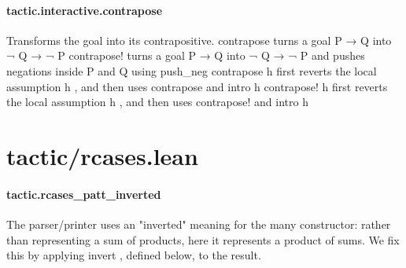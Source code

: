 \documentclass{article}
\begin{document}
\paragraph{tactic.interactive.contrapose}
\par
Transforms the goal into its contrapositive.
\colorbox[RGB]{253,246,227}{{{{\color[RGB]{101, 123, 131} contrapose }}}}     turns a goal 
\colorbox[RGB]{253,246,227}{{{{\color[RGB]{101, 123, 131} P  }}}{{{\color[RGB]{133, 153, 0} → }}}{{{\color[RGB]{101, 123, 131}  Q }}}} into 
\colorbox[RGB]{253,246,227}{{{{\color[RGB]{181, 137, 0} ¬ }}}{{{\color[RGB]{101, 123, 131}  Q  }}}{{{\color[RGB]{133, 153, 0} → }}}{{{\color[RGB]{101, 123, 131}   }}}{{{\color[RGB]{181, 137, 0} ¬ }}}{{{\color[RGB]{101, 123, 131}  P }}}}\colorbox[RGB]{253,246,227}{{{{\color[RGB]{101, 123, 131} contrapose! }}}}    turns a goal 
\colorbox[RGB]{253,246,227}{{{{\color[RGB]{101, 123, 131} P  }}}{{{\color[RGB]{133, 153, 0} → }}}{{{\color[RGB]{101, 123, 131}  Q }}}} into 
\colorbox[RGB]{253,246,227}{{{{\color[RGB]{181, 137, 0} ¬ }}}{{{\color[RGB]{101, 123, 131}  Q  }}}{{{\color[RGB]{133, 153, 0} → }}}{{{\color[RGB]{101, 123, 131}   }}}{{{\color[RGB]{181, 137, 0} ¬ }}}{{{\color[RGB]{101, 123, 131}  P }}}} and pushes negations inside 
\colorbox[RGB]{253,246,227}{{{{\color[RGB]{101, 123, 131} P }}}} and 
\colorbox[RGB]{253,246,227}{{{{\color[RGB]{101, 123, 131} Q }}}}using 
\colorbox[RGB]{253,246,227}{{{{\color[RGB]{101, 123, 131} push\_neg }}}}\colorbox[RGB]{253,246,227}{{{{\color[RGB]{101, 123, 131} contrapose h }}}}   first reverts the local assumption 
\colorbox[RGB]{253,246,227}{{{{\color[RGB]{101, 123, 131} h }}}}, and then uses 
\colorbox[RGB]{253,246,227}{{{{\color[RGB]{101, 123, 131} contrapose }}}} and 
\colorbox[RGB]{253,246,227}{{{{\color[RGB]{101, 123, 131} intro h }}}}\colorbox[RGB]{253,246,227}{{{{\color[RGB]{101, 123, 131} contrapose! h }}}}  first reverts the local assumption 
\colorbox[RGB]{253,246,227}{{{{\color[RGB]{101, 123, 131} h }}}}, and then uses 
\colorbox[RGB]{253,246,227}{{{{\color[RGB]{101, 123, 131} contrapose! }}}} and 
\colorbox[RGB]{253,246,227}{{{{\color[RGB]{101, 123, 131} intro h }}}}\section{tactic/rcases.lean}\paragraph{tactic.rcases\_patt\_inverted}
\par
The parser/printer uses an "inverted" meaning for the 
\colorbox[RGB]{253,246,227}{{{{\color[RGB]{101, 123, 131} many }}}} constructor:
rather than representing a sum of products, here it represents a
product of sums. We fix this by applying 
\colorbox[RGB]{253,246,227}{{{{\color[RGB]{101, 123, 131} invert }}}}, defined below, to
the result.
\end{document}
